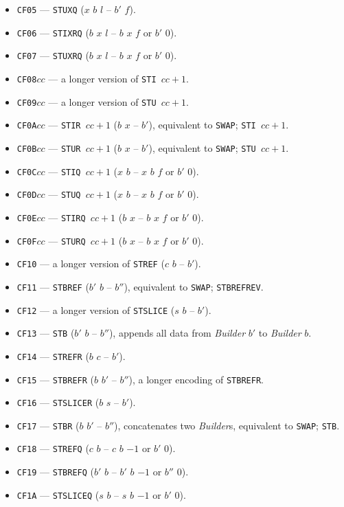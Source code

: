 \documentclass[12pt,oneside]{article}
\begin{document}
\begin{itemize}
\item {\tt CF05} --- {\tt STUXQ} ($x$ $b$ $l$ -- $b'$ $f$).
\item {\tt CF06} --- {\tt STIXRQ} ($b$ $x$ $l$ -- $b$ $x$ $f$ or $b'$ $0$).
\item {\tt CF07} --- {\tt STUXRQ} ($b$ $x$ $l$ -- $b$ $x$ $f$ or $b'$ $0$).
\item {\tt CF08$cc$} --- a longer version of {\tt STI $cc+1$}.
\item {\tt CF09$cc$} --- a longer version of {\tt STU $cc+1$}.
\item {\tt CF0A$cc$} --- {\tt STIR $cc+1$} ($b$ $x$ -- $b'$), equivalent to {\tt SWAP}; {\tt STI $cc+1$}.
\item {\tt CF0B$cc$} --- {\tt STUR $cc+1$} ($b$ $x$ -- $b'$), equivalent to {\tt SWAP}; {\tt STU $cc+1$}.
\item {\tt CF0C$cc$} --- {\tt STIQ $cc+1$} ($x$ $b$ -- $x$ $b$ $f$ or $b'$ $0$).
\item {\tt CF0D$cc$} --- {\tt STUQ $cc+1$} ($x$ $b$ -- $x$ $b$ $f$ or $b'$ $0$).
\item {\tt CF0E$cc$} --- {\tt STIRQ $cc+1$} ($b$ $x$ -- $b$ $x$ $f$ or $b'$ $0$).
\item {\tt CF0F$cc$} --- {\tt STURQ $cc+1$} ($b$ $x$ -- $b$ $x$ $f$ or $b'$ $0$).
\item {\tt CF10} --- a longer version of {\tt STREF} ($c$ $b$ -- $b'$).
\item {\tt CF11} --- {\tt STBREF} ($b'$ $b$ -- $b''$), equivalent to {\tt SWAP}; {\tt STBREFREV}.
\item {\tt CF12} --- a longer version of {\tt STSLICE} ($s$ $b$ -- $b'$).
\item {\tt CF13} --- {\tt STB} ($b'$ $b$ -- $b''$), appends all data from {\em Builder\/} $b'$ to {\em Builder\/} $b$.
\item {\tt CF14} --- {\tt STREFR} ($b$ $c$ -- $b'$).
\item {\tt CF15} --- {\tt STBREFR} ($b$ $b'$ -- $b''$), a longer encoding of {\tt STBREFR}.
\item {\tt CF16} --- {\tt STSLICER} ($b$ $s$ -- $b'$).
\item {\tt CF17} --- {\tt STBR} ($b$ $b'$ -- $b''$), concatenates two {\em Builder\/}s, equivalent to {\tt SWAP}; {\tt STB}.
\item {\tt CF18} --- {\tt STREFQ} ($c$ $b$ -- $c$ $b$ $-1$ or $b'$ $0$).
\item {\tt CF19} --- {\tt STBREFQ} ($b'$ $b$ -- $b'$ $b$ $-1$ or $b''$ $0$).
\item {\tt CF1A} --- {\tt STSLICEQ} ($s$ $b$ -- $s$ $b$ $-1$ or $b'$ $0$).

\end{itemize}
\end{document}
